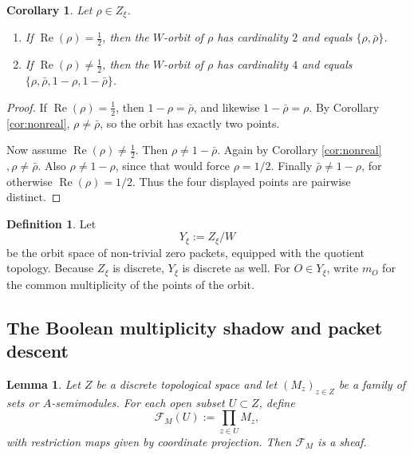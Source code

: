 \documentclass[11pt,a4paper]{article}
\newtheorem{lemma}[theorem]{Lemma}
\newtheorem{corollary}[theorem]{Corollary}
\theoremstyle{definition}
\newtheorem{definition}[theorem]{Definition}
\theoremstyle{remark}
\DeclareMathOperator{\Rea}{Re}
\newcommand{\cF}{\mathcal F}
\begin{document}
\begin{corollary}\label{cor:orbit-sizes}
Let $\rho\in Z_\xi$.
\begin{enumerate}[label=(\roman*)]
\item If $\Rea(\rho)=\frac12$, then the $W$-orbit of $\rho$ has cardinality $2$ and equals $\{\rho,\bar\rho\}$.
\item If $\Rea(\rho)\ne \frac12$, then the $W$-orbit of $\rho$ has cardinality $4$ and equals $\{\rho,\bar\rho,1-\rho,1-\bar\rho\}$.
\end{enumerate}
\end{corollary}

\begin{proof}
If $\Rea(\rho)=\frac12$, then $1-\rho=\bar\rho$, and likewise $1-\bar\rho=\rho$.  By Corollary \ref{cor:nonreal}, $\rho\ne\bar\rho$, so the orbit has exactly two points.

Now assume $\Rea(\rho)\ne\frac12$.  Then $\rho\ne1-\bar\rho$.  Again by Corollary \ref{cor:nonreal}$, \rho\ne\bar\rho$.  Also $\rho\ne1-\rho$, since that would force $\rho=1/2$.  Finally $\bar\rho\ne1-\rho$, for otherwise $\Rea(\rho)=1/2$.  Thus the four displayed points are pairwise distinct.
\end{proof}

\begin{definition}
Let
\[
Y_\xi:=Z_\xi/W
\]
be the orbit space of non-trivial zero packets, equipped with the quotient topology.  Because $Z_\xi$ is discrete, $Y_\xi$ is discrete as well.  For $O\in Y_\xi$, write $m_O$ for the common multiplicity of the points of the orbit.
\end{definition}

\subsection{The Boolean multiplicity shadow and packet descent}

\begin{lemma}\label{lem:product-sheaf}
Let $Z$ be a discrete topological space and let $(M_z)_{z\in Z}$ be a family of sets or $A$-semimodules.  For each open subset $U\subset Z$, define
\[
\cF_M(U):=\prod_{z\in U} M_z,
\]
with restriction maps given by coordinate projection.  Then $\cF_M$ is a sheaf.
\end{lemma}
\end{document}
